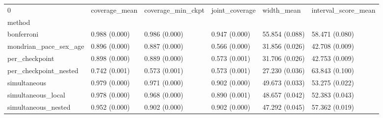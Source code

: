 \begin{tabular}{llllll}
\toprule
0 & coverage\_mean & coverage\_min\_ckpt & joint\_coverage & width\_mean & interval\_score\_mean \\
method &  &  &  &  &  \\
\midrule
bonferroni & 0.988 (0.000) & 0.986 (0.000) & 0.947 (0.000) & 55.854 (0.088) & 58.471 (0.080) \\
mondrian\_pace\_sex\_age & 0.896 (0.000) & 0.887 (0.000) & 0.566 (0.000) & 31.856 (0.026) & 42.708 (0.009) \\
per\_checkpoint & 0.898 (0.000) & 0.889 (0.000) & 0.573 (0.001) & 31.706 (0.026) & 42.753 (0.009) \\
per\_checkpoint\_nested & 0.742 (0.001) & 0.573 (0.001) & 0.573 (0.001) & 27.230 (0.036) & 63.843 (0.100) \\
simultaneous & 0.979 (0.000) & 0.971 (0.000) & 0.902 (0.000) & 49.673 (0.033) & 53.275 (0.022) \\
simultaneous\_local & 0.978 (0.000) & 0.968 (0.000) & 0.890 (0.001) & 48.657 (0.042) & 52.383 (0.043) \\
simultaneous\_nested & 0.952 (0.000) & 0.902 (0.000) & 0.902 (0.000) & 47.292 (0.045) & 57.362 (0.019) \\
\bottomrule
\end{tabular}
